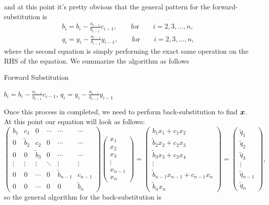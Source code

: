 \documentclass[english,notitlepage]{revtex4-1}  %
\begin{document}
and at this point it's pretty obvious that the general pattern for the forward-substitution is  
\begin{gather}
	b_i = b_i - \frac{a_{i-1}}{b_{i-1}}c_{i-1}, \qquad \text{for} \qquad i=2,3,...,n,\\
	q_i = y_i - \frac{a_{i-1}}{b_{i-1}}y_{i-1}, \qquad \text{for} \qquad i=2,3,...,n,
\end{gather}
where the second equation is simply performing the exact same operation on the RHS of the equation. We summarize the algorithm as follows
\begin{algorithm}[H]
	\caption{Forward Substitution}
	\begin{algorithmic}
		\STATE $b_i = b_i - \frac{a_{i-1}}{b_{i-1}}c_{i-1}$,
		\STATE $q_i = y_i - \frac{a_{i-1}}{b_{i-1}}y_{i-1}$
		\ENDFOR
	\end{algorithmic}
\end{algorithm}
Once this process in completed, we need to perform back-substitution to find $\vb*{x}$. At this point our equation will look as follows: 
\begin{equation}
		\begin{pmatrix}
	b_1 & c_1 & 0 & \cdots & \cdots & \cdots \\
	0 & \tilde{b}_2 & c_2 & 0  &\cdots & \cdots  \\ 
	0 & 0 & \tilde{b}_3 & 0 & \cdots & \cdots \\
	\vdots & \vdots & \vdots & \ddots & \vdots & \vdots \\
	0 & 0 & \cdots & 0 & \tilde{b}_{n-1} & c_{n-1} \\
	0 & 0 & \cdots  & 0 & 0 & \tilde{b}_n
	\end{pmatrix}
	\begin{pmatrix}
	x_1 \\ x_2 \\ x_3 \\ \vdots \\ x_{n-1} \\ x_n
	\end{pmatrix}
	=
	\begin{pmatrix}
	b_1x_1 + c_1x_2\\
	\tilde{b}_2x_2 + c_2x_3 \\
	\tilde{b}_3x_3 + c_3x_4 \\
	\vdots \\
	\tilde{b}_{n-1}x_{n-1} + c_{n-1}x_{n} \\
	\tilde{b}_nx_n
	\end{pmatrix}
	=
	\begin{pmatrix}
	\tilde{q}_1 \\ \tilde{q}_2 \\ \tilde{q}_3 \\ \vdots \\ \tilde{q}_{n-1} \\ \tilde{q}_n
	\end{pmatrix},
\end{equation}
so the general algorithm for the back-substitution is 
\end{document}
